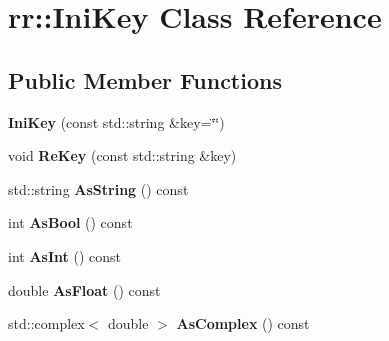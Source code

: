 \hypertarget{classrr_1_1_ini_key}{\section{rr\-:\-:Ini\-Key Class Reference}
\label{classrr_1_1_ini_key}
}
\subsection*{Public Member Functions}
\begin{DoxyCompactItemize}
\item 
\hypertarget{classrr_1_1_ini_key_ad7d41c015f038abe5b0618ef0af8f2d8}{{\bfseries Ini\-Key} (const std\-::string \&key=\char`\"{}\char`\"{})}\label{classrr_1_1_ini_key_ad7d41c015f038abe5b0618ef0af8f2d8}

\item 
\hypertarget{classrr_1_1_ini_key_a2e5510fe9601d1317d1375572ff63480}{void {\bfseries Re\-Key} (const std\-::string \&key)}\label{classrr_1_1_ini_key_a2e5510fe9601d1317d1375572ff63480}

\item 
\hypertarget{classrr_1_1_ini_key_aeb1d284acb08627a16667146c30df56c}{std\-::string {\bfseries As\-String} () const }\label{classrr_1_1_ini_key_aeb1d284acb08627a16667146c30df56c}

\item 
\hypertarget{classrr_1_1_ini_key_a36362ee277dd6fb6a05f52cbb3c2e3e4}{int {\bfseries As\-Bool} () const }\label{classrr_1_1_ini_key_a36362ee277dd6fb6a05f52cbb3c2e3e4}

\item 
\hypertarget{classrr_1_1_ini_key_a1ff46c13328e593d9120b4e5ce49723a}{int {\bfseries As\-Int} () const }\label{classrr_1_1_ini_key_a1ff46c13328e593d9120b4e5ce49723a}

\item 
\hypertarget{classrr_1_1_ini_key_abfa15e98a5ecc2b68703e3e8ebbef674}{double {\bfseries As\-Float} () const }\label{classrr_1_1_ini_key_abfa15e98a5ecc2b68703e3e8ebbef674}

\item 
\hypertarget{classrr_1_1_ini_key_a57045db159e73f7100ce99cb98ad6c4f}{std\-::complex$<$ double $>$ {\bfseries As\-Complex} () const }\label{classrr_1_1_ini_key_a57045db159e73f7100ce99cb98ad6c4f}

\end{DoxyCompactItemize}
